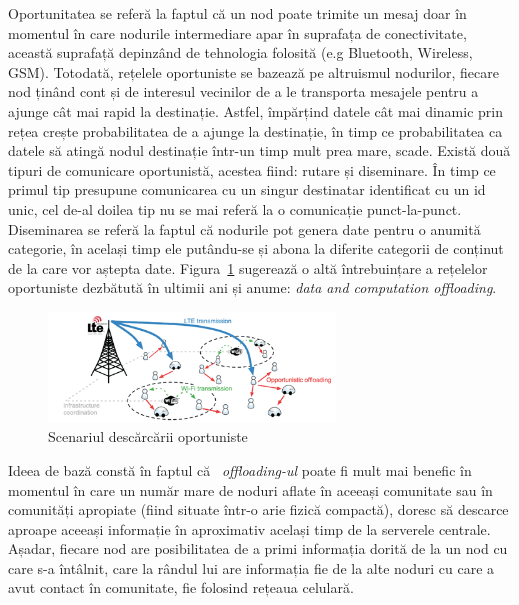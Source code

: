\documentclass[12pt,a4paper]{report}
\begin{document}
Oportunitatea se referă la faptul că un nod poate trimite un mesaj doar în momentul în care nodurile intermediare apar în suprafața de conectivitate, această suprafață depinzând de tehnologia folosită (e.g Bluetooth, Wireless, GSM). Totodată, rețelele oportuniste se bazează pe altruismul nodurilor, fiecare nod ținând cont și de interesul vecinilor de a le transporta mesajele pentru a ajunge cât mai rapid la destinație. Astfel, împărțind datele cât mai dinamic prin rețea crește probabilitatea de a ajunge la destinație, în timp ce probabilitatea ca datele să atingă nodul destinație într-un timp mult prea mare, scade. Există două tipuri de comunicare oportunistă, acestea fiind: rutare și diseminare. În timp ce primul tip presupune comunicarea cu un singur destinatar identificat cu un id unic, cel de-al doilea tip nu se mai referă la o comunicație punct-la-punct. Diseminarea se referă la faptul că nodurile pot genera date pentru o anumită categorie, în același timp ele putându-se și abona la diferite categorii de conținut de la care vor aștepta date. 
Figura~\ref{fig:pic1} sugerează o altă întrebuințare a rețelelor oportuniste dezbătută în ultimii ani și anume: \textit{data and computation offloading}.
\begin{figure}[th]
\centering
\includegraphics[width=3in]{pics/ONs.png}
  \caption{Scenariul descărcării oportuniste\protect\footnotemark}
  \label{fig:pic1}
\end{figure}
Ideea de bază constă în faptul că ~\textit{offloading-ul} poate fi mult mai benefic în momentul în care un număr mare de noduri aflate în aceeași comunitate sau în comunități apropiate (fiind situate într-o arie fizică compactă), doresc să descarce aproape aceeași informație în aproximativ același timp de la serverele centrale. Așadar, fiecare nod are posibilitatea de a primi informația dorită de la un nod cu care s-a întâlnit, care la rândul lui are informația fie de la alte noduri cu care a avut contact în comunitate, fie folosind rețeaua celulară.
\end{document}
